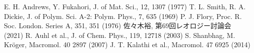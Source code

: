 \beamertemplatetextbibitems
\small
\begin{thebibliography}{99}
     E. H. Andrews, Y. Fukahori, J. of Mat. Sci., 12, 1307 (1977)
     T. L. Smith, R. A. Dickie, J. of Polym. Sci. A-2: Polym. Phys., 7, 635 (1969)
     P. J. Flory, Proc. R. Soc. London. Series A, 351, 351 (1976)
     佐々木裕, 第69回レオロジー討論会 (2021)
     R. Auhl et al., J. of Chem. Phys., 119, 12718 (2003)
     S. Shanbhag, M. Kr\"{o}ger, Macromol. 40 2897 (2007)
     J. T. Kalathi et al., Macromol. 47 6925 (2014)
\end{thebibliography}